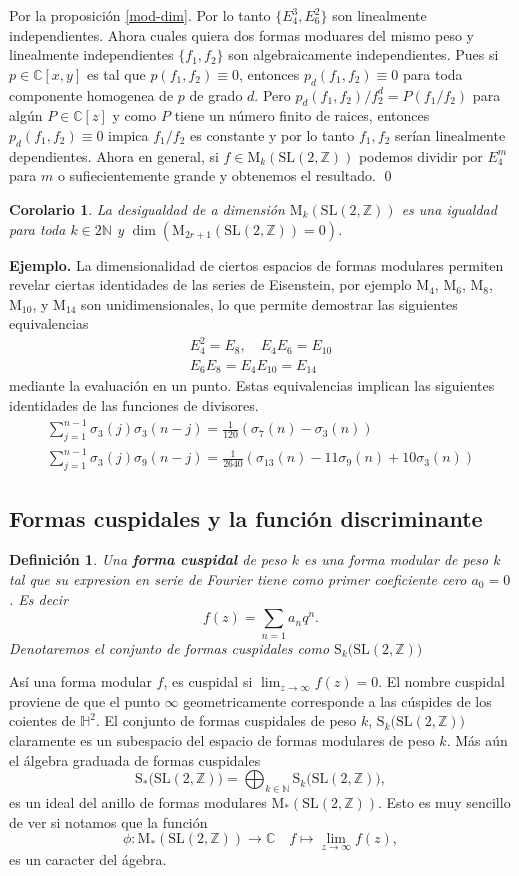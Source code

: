 \documentclass[letterpaper]{article}
\newtheorem{cor}[teorema]{Corolario}
\newtheorem{def.}{Definici\'on}[section]
\newcommand{\nat}{\ensuremath{ \mathbb N }}
\newcommand{\eje}{{\newline \noindent \sc \textbf{Ejemplo. }}}
\newcommand{\co}{\ensuremath{\mathbb C }}
\newcommand{\hd}{\ensuremath{\mathbb H^2}}
\newcommand{\slz}{\ensuremath{\mathrm{SL}(2,\mathbb Z) }}
\newcommand{\mdlr}{\ensuremath{\mathrm{M}}}
\begin{document}
\noindent Por la proposición \ref{mod-dim}. Por lo tanto \(\{E_4^{3},E_6^{2}\}\) son linealmente independientes. Ahora cuales quiera dos formas moduares del mismo peso y linealmente independientes \(\{f_1,f_2\}\) son algebraicamente independientes. Pues si \(p\in\co[x,y]\) es tal que \(p(f_1,f_2)\equiv0\), entonces \(p_d(f_1,f_2)\equiv0\) para toda componente homogenea de \(p\) de grado \(d\). Pero \(p_d(f_1,f_2)/f_2^d=P(f_1/f_2)\) para algún \(P\in\co[z]\) y como \(P\) tiene un número finito de raices, entonces \(p_d(f_1,f_2)\equiv0\) impica \(f_1/f_2\) es constante y por lo tanto \(f_1,f_2\) serían linealmente dependientes. Ahora en general, si \(f\in\mdlr_k(\slz)\) podemos dividir por \(E_4^m\) para \(m\) o sufiecientemente grande y obtenemos el resultado.
\qed
\begin{cor}
La desigualdad de a dimensión \(\mdlr_k(\slz)\) es una igualdad para toda \(k\in2\nat\) y \(\dim(\mdlr_{2r+1}(\slz)=0)\).
\end{cor}
\eje La dimensionalidad de ciertos espacios de formas modulares permiten revelar ciertas identidades de las series de Eisenstein, por ejemplo \(\mdlr_4\), \(\mdlr_6\), \(\mdlr_{8}\), \(\mdlr_10\), y \(\mdlr_{14}\) son unidimensionales, lo que permite demostrar las siguientes equivalencias
\begin{align*}
E_4^2=E_8,\quad E_4E_6=E_{10}\\
E_6E_8=E_4E_{10}=E_{14}
\end{align*}
\noindent mediante la evaluación en un punto. Estas equivalencias implican las siguientes identidades de las funciones de divisores.
\begin{align*}
\sum_{j=1}^{n-1}\sigma_3(j)\sigma_3(n-j)=\frac{1}{120}(\sigma_7(n)-\sigma_3(n))\\
\sum_{j=1}^{n-1}\sigma_3(j)\sigma_9(n-j)=\frac{1}{2640}(\sigma_{13}(n)-11\sigma_9(n)+10\sigma_3(n))
\end{align*}
\subsection{Formas cuspidales y la función discriminante}
\label{sec:org8b3675b}
\begin{def.}
Una \textbf{forma cuspidal} de peso \(k\) es una forma modular de peso \(k\) tal que su expresion en serie de Fourier tiene como primer coeficiente cero \(a_0=0\). Es decir
\[
    f(z)=\sum_{n=1}a_nq^n.
\]
Denotaremos el conjunto de formas cuspidales como \(\mathrm{S}_k\big(\slz\big)\)
\end{def.}
\noindent Así una forma modular \(f\), es cuspidal si \(\lim_{z\rightarrow\infty}f(z)=0\). El nombre cuspidal proviene de que el punto \(\infty\) geometricamente corresponde a las cúspides de los coientes de \(\hd\). El conjunto de formas cuspidales de peso \(k\), \(\mathrm{S}_k\big(\slz\big)\) claramente es un subespacio del espacio de formas modulares de peso \(k\). Más aún el álgebra graduada de formas cuspidales
\[
    \mathrm{S}_{*}\big(\slz\big)=\bigoplus_{k\in\nat}\mathrm{S}_k\big(\slz\big),
\]
\noindent es un ideal del anillo de formas modulares \(\mdlr_{*}(\slz)\). Esto es muy sencillo de ver si notamos que la función
\[
    \phi:\mdlr_{*}(\slz)\rightarrow\co\quad f\mapsto\lim_{z\rightarrow\infty}f(z),
\]
\noindent es un caracter del ágebra.
\end{document}
